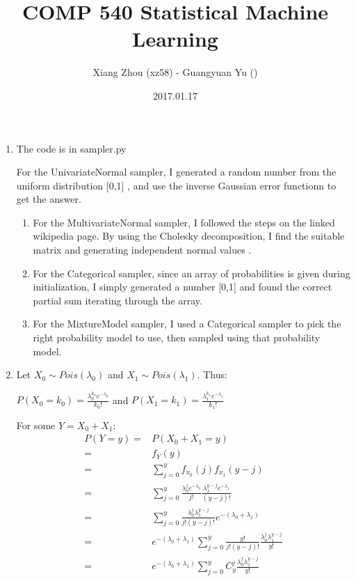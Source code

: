 \documentclass[pdftex,11pt]{article}
\begin{document}
\title{COMP 540 Statistical Machine Learning}
\author{Xiang Zhou (xz58) - Guangyuan Yu ()}
\date{2017.01.17}
\maketitle
\newcommand{\pr}{\mathbb{P}}
\begin{enumerate}
\item The code is in sampler.py

For the UnivariateNormal sampler, I generated a random number from
the uniform distribution {[}0,1{]} , and use the inverse Gaussian
error functionn to get the answer.
\begin{enumerate}
\item For the MultivariateNormal sampler, I followed the steps on the linked
wikipedia page. By using the Cholesky decomposition, I find the suitable
matrix and generating independent normal values .
\item For the Categorical sampler, since an array of probabilities is given
during initialization, I simply generated a number {[}0,1{]} and found
the correct partial sum iterating through the array.
\item For the MixtureModel sampler, I used a Categorical sampler to pick
the right probability model to use, then sampled using that probability
model.
\end{enumerate}
\item Let $X_0 \sim Pois(\lambda_0)$ and $X_1 \sim Pois(\lambda_1)$. Thus:\\
\begin{center}
$P(X_0 = k_0) = \frac{\lambda_0^{k_0}e^{-\lambda_0}}{k_0!}$ and $P(X_1 = k_1) = \frac{\lambda_1^{k_1}e^{-\lambda_1}}{k_1!}$
\end{center}For some $Y=X_{0}+X_{1}$:
\begin{align*}
P(Y=y)= & P(X_{0}+X_{1}=y)\\
= & f_{Y}(y)\\
= & \sum\limits _{j=0}^{y}f_{x_{0}}(j)f_{x_{1}}(y-j)\\
= & \sum\limits _{j=0}^{y}\frac{\lambda_{0}^{j}e^{-\lambda_{0}}}{j!}\frac{\lambda_{1}^{y-j}e^{-\lambda_{1}}}{(y-j)!}\\
= & \sum\limits _{j=0}^{y}\frac{\lambda_{0}^{j}\lambda_{1}^{y-j}}{j!(y-j)!}e^{-(\lambda_{0}+\lambda_{1})}\\
= & e^{-(\lambda_{0}+\lambda_{1})}\sum\limits _{j=0}^{y}\frac{y!}{j!(y-j)!}\frac{\lambda_{0}^{j}\lambda_{1}^{y-j}}{y!}\\
= & e^{-(\lambda_{0}+\lambda_{1})}\sum\limits _{j=0}^{y}C_{y}^{j}\frac{\lambda_{0}^{j}\lambda_{1}^{y-j}}{y!}\\

\end{align*}
\end{enumerate}
\end{document}
